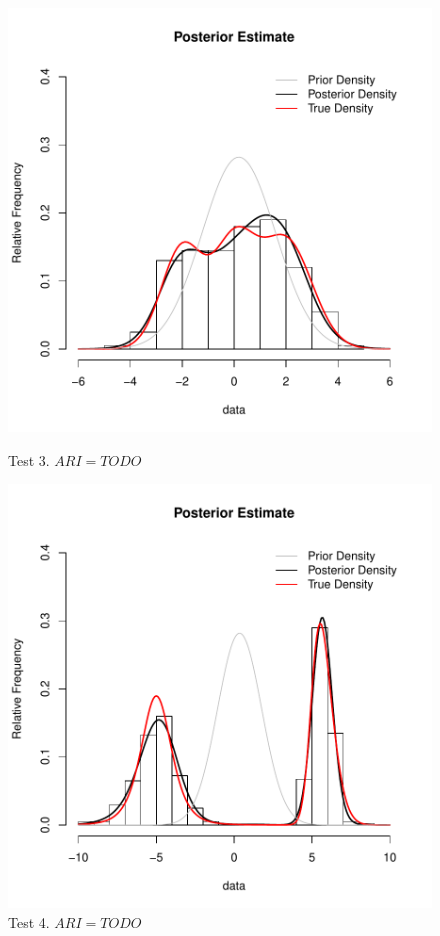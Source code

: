 \begin{figure}[h]
	\centering
	\begin{minipage}{0.5\textwidth}
		\includegraphics[scale=0.4]{etc/test3.pdf}
		\captionsetup{labelformat=empty}
		\caption{Test 3. $ARI = TODO$}
	\end{minipage}%
	\begin{minipage}{0.5\textwidth}
		\includegraphics[scale=0.4]{etc/test4.pdf}
		\captionsetup{labelformat=empty}
		\caption{Test 4. $ARI = TODO$}
	\end{minipage}
\end{figure}

